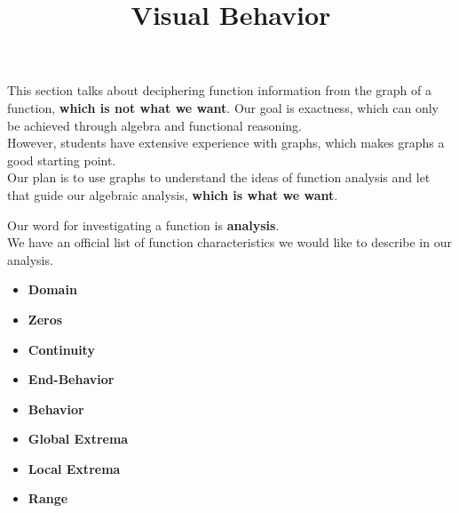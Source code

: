 \documentclass{ximera}
\title{Visual Behavior}
\begin{document}
\begin{abstract}
\end{abstract}
\maketitle





\begin{warning}


This section talks about deciphering function information from the graph of a function, \textbf{\textcolor{red!80!black}{which is not what we want}}.  Our goal is exactness, which can only be achieved through algebra and functional reasoning.\\

However, students have extensive experience with graphs, which makes graphs a good starting point. \\

Our plan is to use graphs to understand the ideas of function analysis and let that guide our algebraic analysis, \textbf{\textcolor{red!80!black}{which is what we want}}.

\end{warning}






Our word for investigating a function is \textbf{\textcolor{blue!55!black}{analysis}}. \\

We have an official list of function characteristics we would like to describe in our analysis. \\





\begin{itemize}
\item \textbf{\textcolor{blue!55!black}{Domain}}
\item \textbf{\textcolor{blue!55!black}{Zeros}}
\item \textbf{\textcolor{blue!55!black}{Continuity}}
\item \textbf{\textcolor{blue!55!black}{End-Behavior}}
\item \textbf{\textcolor{blue!55!black}{Behavior}}
\item \textbf{\textcolor{blue!55!black}{Global Extrema}}
\item \textbf{\textcolor{blue!55!black}{Local Extrema}}
\item \textbf{\textcolor{blue!55!black}{Range}}
\end{itemize}
\end{document}
